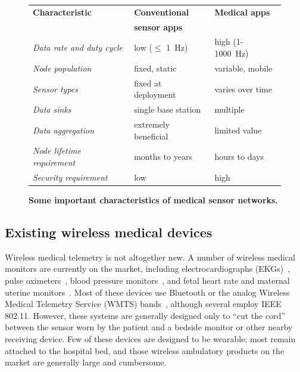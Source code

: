 \begin{figure}[t]
\begin{center}
\begin{small}
\begin{tabular}{|l|l|l|}  \hline
{\bf Characteristic} & 
{\bf Conventional } &
{\bf Medical apps} \\ 

& {\bf sensor apps} & \\ \hline

{\em Data rate and duty cycle}  & low ($\leq$ 1~Hz) & high (1-1000~Hz) \\
{\em Node population} & fixed, static &  variable, mobile \\
{\em Sensor types} & fixed at deployment & varies over time \\
{\em Data sinks} & single base station & multiple \\
{\em Data aggregation} & extremely beneficial & limited value \\
{\em Node lifetime requirement} & months to years & hours to days \\
{\em Security requirement} &  low & high \\ \hline
\end{tabular}
\end{small}
\end{center}
\caption{{{\small\bf Some important characteristics of medical sensor
networks.}}}
\label{table-diffs}
\end{figure}



\subsection{Existing wireless medical devices}

Wireless medical telemetry is not altogether new. A number of wireless
medical monitors are currently on the market, including
electrocardiographs (EKGs)~\cite{LifeSync,HealthFrontier,apexproch},
pulse oximeters~\cite{nonin,micropaq}, blood pressure
monitors~\cite{cardguard,aanddmedical}, and fetal heart rate and
maternal uterine monitors~\cite{corometrics340m}.  Most of these
devices use Bluetooth or the analog Wireless Medical Telemetry Service
(WMTS) bands~\cite{wmts}, although several employ IEEE 802.11.
However, these systems are generally designed only to ``cut the cord''
between the sensor worn by the patient and a bedside monitor or other
nearby receiving device.  
Few of these devices are designed to be wearable; most remain 
attached to the hospital bed, and those wireless ambulatory products 
on the market are generally large and cumbersome.  



